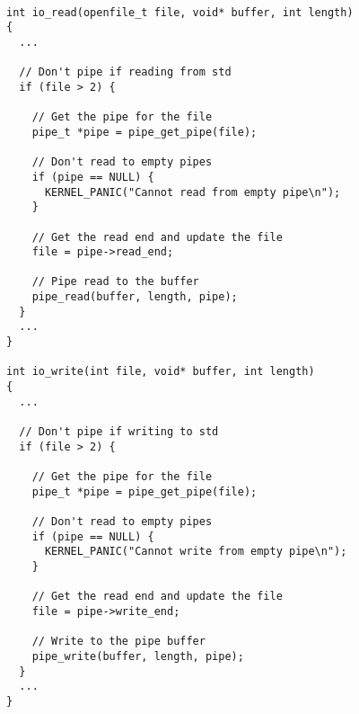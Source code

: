 \documentclass[12pt]{article}
\begin{document}
\begin{lstlisting}[caption=io.c]

int io_read(openfile_t file, void* buffer, int length)
{
  ...  

  // Don't pipe if reading from std
  if (file > 2) {

    // Get the pipe for the file
    pipe_t *pipe = pipe_get_pipe(file);

    // Don't read to empty pipes 
    if (pipe == NULL) {
      KERNEL_PANIC("Cannot read from empty pipe\n");
    }

    // Get the read end and update the file
    file = pipe->read_end;

    // Pipe read to the buffer
    pipe_read(buffer, length, pipe);
  }
  ...
}

int io_write(int file, void* buffer, int length)
{
  ...

  // Don't pipe if writing to std
  if (file > 2) {

    // Get the pipe for the file
    pipe_t *pipe = pipe_get_pipe(file);

    // Don't read to empty pipes
    if (pipe == NULL) {
      KERNEL_PANIC("Cannot write from empty pipe\n");
    }

    // Get the read end and update the file
    file = pipe->write_end;

    // Write to the pipe buffer
    pipe_write(buffer, length, pipe);
  }
  ...
}

\end{lstlisting}
\end{document}
